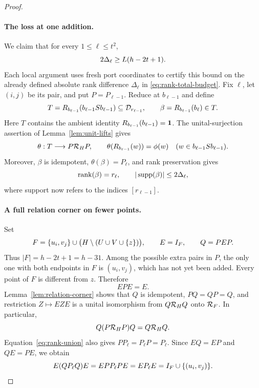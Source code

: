 \begin{proof}
\paragraph{The loss at one addition.}
We claim that for every $1\le\ell\le t^2$,
\begin{equation}\label{eq:rank-single-step}
 2\Delta_\ell\ge L(h-2t+1).
\end{equation}
Each local argument uses fresh port coordinates to certify this bound
on the already defined absolute rank difference $\Delta_\ell$ in
\eqref{eq:rank-total-budget}.
Fix $\ell$, let $(i,j)$ be its pair, and put
$P=P_{\ell-1}$. Reduce at $b_{\ell-1}$ and define
\[
 T=R_{b_{\ell-1}}(b_{\ell-1}Sb_{\ell-1})
       \subseteq\mathcal D_{r_{\ell-1}},\qquad
 \beta=R_{b_{\ell-1}}(b_\ell)\in T.
\]
Here $T$ contains the ambient identity
$R_{b_{\ell-1}}(b_{\ell-1})=\mathbf 1$. The unital-surjection assertion of
Lemma~\ref{lem:unit-lifts} gives
\[
 \theta:T\longrightarrow P\mathcal R_{H}P,
 \qquad
 \theta(R_{b_{\ell-1}}(w))=\phi(w)
 \quad(w\in b_{\ell-1}Sb_{\ell-1}).
\]
Moreover, $\beta$ is idempotent,
$\theta(\beta)=P_\ell$, and rank preservation gives
\begin{equation}\label{eq:rank-step-support}
 \operatorname{rank}(\beta)=r_\ell,
 \qquad |\operatorname{supp}(\beta)|\le2\Delta_\ell,
\end{equation}
where support now refers to the indices $[r_{\ell-1}]$.

\paragraph{A full relation corner on fewer points.}
Set
\[
 F=\{u_i,v_j\}\cup\bigl(H\setminus(U\cup V\cup\{z\})\bigr),
 \qquad E=I_{F},\qquad Q=PEP.
\]
Thus $|F|=h-2t+1=h-31$. Among the possible extra pairs in $P$, the
only one with both endpoints in $F$ is $(u_i,v_j)$, which has not yet
been added. Every point of $F$ is different from $z$. Therefore
\[
 EPE=E.
\]
Lemma~\ref{lem:relation-corner} shows that $Q$ is idempotent,
$PQ=QP=Q$, and restriction $Z\mapsto EZE$ is a unital isomorphism
from $Q\mathcal R_{H}Q$ onto $\mathcal R_{F}$. In particular,
\[
 Q(P\mathcal R_{H}P)Q=Q\mathcal R_{H}Q.
\]
Equation~\eqref{eq:rank-union} also gives $PP_\ell=P_\ell P=P_\ell$.
Since $EQ=EP$ and $QE=PE$, we obtain
\begin{equation}\label{eq:rank-smaller-image}
 E(QP_\ell Q)E
 =EP P_\ell PE
 =EP_\ell E
 =I_{F}\cup\{(u_i,v_j)\}.
\end{equation}


\end{proof}

